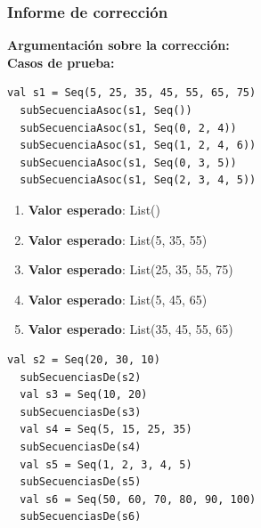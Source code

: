 \documentclass[12pt, a4paper]{article}
\begin{document}
\subsubsection{Informe de corrección}
\textbf{Argumentación sobre la corrección: \\}
\textbf{Casos de prueba: \\}
\begin{lstlisting}[caption=Casos de prueba para la función subSecuenciaAsoc, label=lst:scala_code]
  val s1 = Seq(5, 25, 35, 45, 55, 65, 75)
  subSecuenciaAsoc(s1, Seq())
  subSecuenciaAsoc(s1, Seq(0, 2, 4))
  subSecuenciaAsoc(s1, Seq(1, 2, 4, 6))
  subSecuenciaAsoc(s1, Seq(0, 3, 5))
  subSecuenciaAsoc(s1, Seq(2, 3, 4, 5))
\end{lstlisting}
\begin{enumerate}
  \item \textbf{Valor esperado}: List()
  \item \textbf{Valor esperado}: List(5, 35, 55)
  \item \textbf{Valor esperado}: List(25, 35, 55, 75)
  \item \textbf{Valor esperado}: List(5, 45, 65)
  \item \textbf{Valor esperado}: List(35, 45, 55, 65)
\end{enumerate}
\begin{lstlisting}[caption=Casos de prueba para la función subSecuenciasDe, label=lst:scala_code]
  val s2 = Seq(20, 30, 10)
  subSecuenciasDe(s2)  
  val s3 = Seq(10, 20)
  subSecuenciasDe(s3)  
  val s4 = Seq(5, 15, 25, 35)
  subSecuenciasDe(s4)  
  val s5 = Seq(1, 2, 3, 4, 5)
  subSecuenciasDe(s5)  
  val s6 = Seq(50, 60, 70, 80, 90, 100)
  subSecuenciasDe(s6)  
\end{lstlisting}
\end{document}
